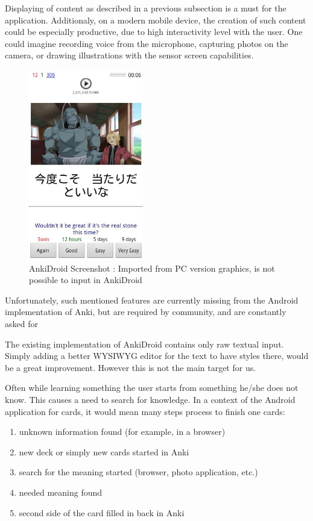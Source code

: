 \documentclass[a4paper,11pt,twoside]{article}
\begin{document}
Displaying of content as described in a previous subsection is a must for the application. Additionaly, on a modern mobile device, the creation 
of such content could be especially productive, due to high interactivity level with the user. One could imagine
recording voice from the microphone, capturing photos on the camera, or drawing illustrations with the sensor 
screen capabilities.

\begin{figure}[t]
\centering
\label{fig:Graphics}
\includegraphics[width=5cm]{Screenshot1}
\caption{AnkiDroid Screenshot : Imported from PC version graphics, is not possible to input in AnkiDroid}
\end{figure}


Unfortunately, such mentioned features are currently missing from the Android implementation of Anki, but 
are required by community, and are constantly asked for \citet{ankigcode}


The existing implementation of AnkiDroid contains only raw textual input. Simply adding a better WYSIWYG editor 
for the text to have styles there, would be a great improvement. However this is not the main target for us.

Often while learning something the user starts from something he/she does not know. This causes a need to search for
knowledge. In a context of the Android application for cards, it would mean many steps process to finish one cards:

\begin{enumerate}
  \item unknown information found (for example, in a browser)
  \item new deck or simply new cards started in Anki
  \item search for the meaning started (browser, photo application, etc.)
  \item needed meaning found
  \item second side of the card filled in back in Anki
\end{enumerate}
\end{document}
